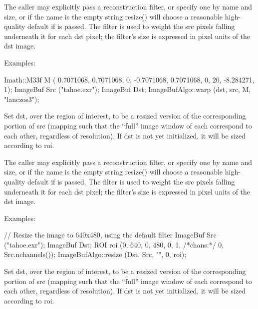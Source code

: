 The caller may explicitly pass a reconstruction filter, or specify one by
name and size, or if the name is the empty string {\cf resize()} will choose
a reasonable high-quality default if \NULL is passed.  The filter is used to
weight the {\cf src} pixels falling underneath it for each {\cf dst} pixel;
the filter's size is expressed in pixel units of the {\cf dst} image.

\smallskip
\noindent Examples:
\begin{code}
    Imath::M33f M ( 0.7071068, 0.7071068, 0,
                   -0.7071068, 0.7071068, 0,
                   20,        -8.284271,  1);
    ImageBuf Src ("tahoe.exr");
    ImageBuf Dst;
    ImageBufAlgo::warp (dst, src, M, "lanczos3");
\end{code}
\apiend


 
Set {\cf dst}, over the region of interest, to be a resized version of the
corresponding portion of {\cf src} (mapping such that the ``full'' image
window of each correspond to each other, regardless of resolution).  If
{\cf dst} is not yet initialized, it will be sized according to {\cf roi}.

The caller may explicitly pass a reconstruction filter, or specify one by
name and size, or if the name is the empty string {\cf resize()} will choose
a reasonable high-quality default if \NULL is passed.  The filter is used to
weight the {\cf src} pixels falling underneath it for each {\cf dst} pixel;
the filter's size is expressed in pixel units of the {\cf dst} image.

\smallskip
\noindent Examples:
\begin{code}
    // Resize the image to 640x480, using the default filter
    ImageBuf Src ("tahoe.exr");
    ImageBuf Dst;
    ROI roi (0, 640, 0, 480, 0, 1, /*chans:*/ 0, Src.nchannels());
    ImageBufAlgo::resize (Dst, Src, "", 0, roi);
\end{code}
\apiend


 
Set {\cf dst}, over the region of interest, to be a resized version of the
corresponding portion of {\cf src} (mapping such that the ``full'' image
window of each correspond to each other, regardless of resolution).  If
{\cf dst} is not yet initialized, it will be sized according to {\cf roi}.

